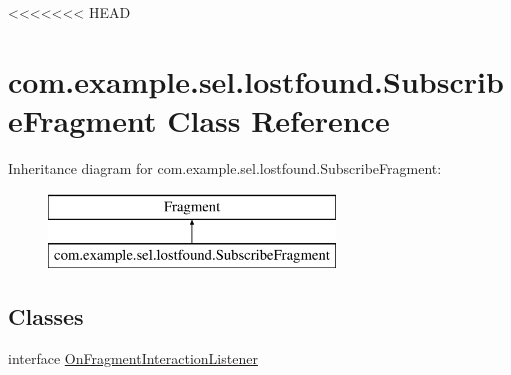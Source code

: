 <<<<<<< HEAD
\hypertarget{classcom_1_1example_1_1sel_1_1lostfound_1_1SubscribeFragment}{\section{com.\-example.\-sel.\-lostfound.\-Subscribe\-Fragment Class Reference}
\label{classcom_1_1example_1_1sel_1_1lostfound_1_1SubscribeFragment}
}
Inheritance diagram for com.\-example.\-sel.\-lostfound.\-Subscribe\-Fragment\-:\begin{figure}[H]
\begin{center}
\leavevmode
\includegraphics[height=2.000000cm]{classcom_1_1example_1_1sel_1_1lostfound_1_1SubscribeFragment}
\end{center}
\end{figure}
\subsection*{Classes}
\begin{DoxyCompactItemize}
\item 
interface \hyperlink{interfacecom_1_1example_1_1sel_1_1lostfound_1_1SubscribeFragment_1_1OnFragmentInteractionListener}{On\-Fragment\-Interaction\-Listener}
\end{DoxyCompactItemize}
